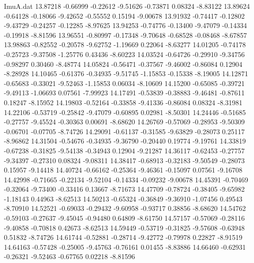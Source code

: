 \begin{filecontents}{ImuA.dat}
  13.87218   -0.66999   -0.22612   -9.51626   -0.73871    0.08324   -8.83122
  13.89624   -0.64128   -0.18066   -9.42652   -0.55552    0.15194   -9.00678
  13.91932   -0.74417   -0.12802   -9.43729   -0.24257   -0.12285   -8.97625
  13.94253   -0.74776   -0.13400   -9.47079   -0.14334   -0.19918   -8.81596
  13.96551   -0.80997   -0.17348   -9.70648   -0.68528   -0.08468   -8.67857
  13.98863   -0.82552   -0.20578   -9.62752   -1.19669    0.22064   -8.63277
  14.01205   -0.74178   -0.25723   -9.37508   -1.25776    0.43436   -8.60223
  14.03524   -0.64726   -0.29910   -9.34756   -0.98297    0.30460   -8.48774
  14.05824   -0.56471   -0.37567   -9.46002   -0.86084    0.12904   -8.28928
  14.10465   -0.61376   -0.34935   -9.51745   -1.15853   -0.15338   -8.19005
  14.12871   -0.65683   -0.33021   -9.52463   -1.15853    0.06034   -8.10609
  14.15200   -0.65085   -0.39721   -9.49113   -1.06693    0.07561   -7.99923
  14.17491   -0.53839   -0.38883   -9.46481   -0.87611    0.18247   -8.15952
  14.19803   -0.52164   -0.33858   -9.41336   -0.86084    0.08324   -8.31981
  14.22106   -0.53719   -0.25842   -9.47079   -0.60895    0.02981   -8.50301
  14.24446   -0.51685   -0.27757   -9.45524   -0.30363    0.00691   -8.68620
  14.26769   -0.57069   -0.28953   -9.50309   -0.06701   -0.07705   -8.74726
  14.29091   -0.61137   -0.31585   -9.63829   -0.28073    0.25117   -8.96862
  14.31504   -0.54676   -0.34935   -9.36790   -0.20440    0.19774   -9.19761
  14.33819   -0.67238   -0.31825   -9.54138   -0.34943    0.12904   -9.21287
  14.36117   -0.62453   -0.27757   -9.34397   -0.27310    0.08324   -9.08311
  14.38417   -0.68913   -0.32183   -9.50549   -0.28073    0.15957   -9.14418
  14.40724   -0.66162   -0.25364   -9.46361   -0.15097    0.07561   -9.16708
  14.42998   -0.71665   -0.22134   -9.52104   -0.14334   -0.09232   -9.00678
  14.45391   -0.70469   -0.32064   -9.73400   -0.33416    0.13667   -8.71673
  14.47709   -0.78724   -0.38405   -9.65982   -1.18143    0.44963   -8.62513
  14.50213   -0.65324   -0.36849   -9.36910   -1.07456    0.49543   -8.70910
  14.52521   -0.69033   -0.29432   -9.60958   -0.93717    0.38856   -8.68620
  14.54762   -0.59103   -0.27637   -9.45045   -0.94480    0.64809   -8.61750
  14.57157   -0.57069   -0.28116   -9.40858   -0.70818    0.42673   -8.62513
  14.59449   -0.53719   -0.31825   -9.57608   -0.63948    0.51832   -8.74726
  14.61744   -0.52881   -0.28714   -9.42772   -0.79978    0.22827   -8.91519
  14.64163   -0.57428   -0.25005   -9.45763   -0.76161    0.01455   -8.83886
  14.66460   -0.62931   -0.26321   -9.52463   -0.67765    0.02218   -8.81596

\end{filecontents}

